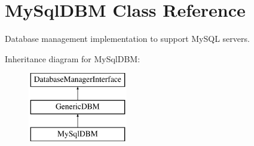 \hypertarget{classMySqlDBM}{\section{My\-Sql\-D\-B\-M Class Reference}
\label{classMySqlDBM}
}


Database management implementation to support My\-S\-Q\-L servers.  


Inheritance diagram for My\-Sql\-D\-B\-M\-:\begin{figure}[H]
\begin{center}
\leavevmode
\includegraphics[height=3.000000cm]{classMySqlDBM}
\end{center}
\end{figure}
